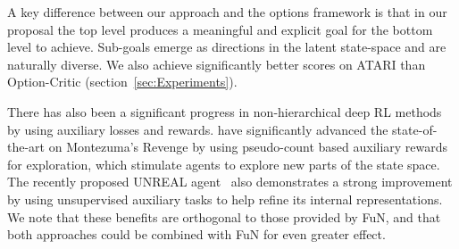 A key difference between our approach and the options framework is that in our proposal the top level produces a meaningful and explicit goal for the bottom level to achieve. Sub-goals emerge as directions in the latent state-space and are naturally diverse. We also achieve significantly better scores on ATARI than Option-Critic (section~\ref{sec:Experiments}).


There has also been a significant progress in non-hierarchical deep RL methods by using auxiliary losses and rewards. \cite{bellemare2016countexplore} have significantly advanced the state-of-the-art on Montezuma's Revenge by using pseudo-count based auxiliary rewards for exploration, which stimulate agents to explore new parts of the state space. The recently proposed UNREAL agent~\cite{jaderberg2016unreal} also demonstrates a strong improvement by using unsupervised auxiliary tasks to help refine its internal representations. We note that these benefits are orthogonal to those provided by FuN, and that both approaches could be combined with FuN for even greater effect. 

